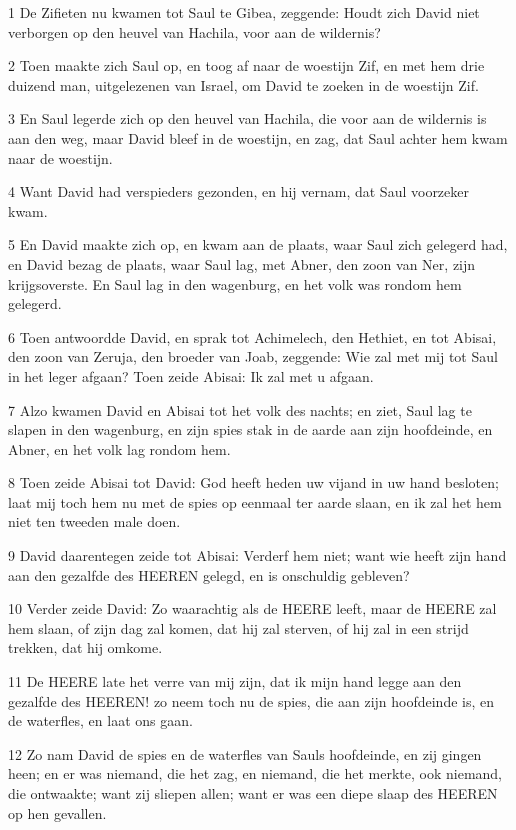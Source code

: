 \par 1 De Zifieten nu kwamen tot Saul te Gibea, zeggende: Houdt zich David niet verborgen op den heuvel van Hachila, voor aan de wildernis?
\par 2 Toen maakte zich Saul op, en toog af naar de woestijn Zif, en met hem drie duizend man, uitgelezenen van Israel, om David te zoeken in de woestijn Zif.
\par 3 En Saul legerde zich op den heuvel van Hachila, die voor aan de wildernis is aan den weg, maar David bleef in de woestijn, en zag, dat Saul achter hem kwam naar de woestijn.
\par 4 Want David had verspieders gezonden, en hij vernam, dat Saul voorzeker kwam.
\par 5 En David maakte zich op, en kwam aan de plaats, waar Saul zich gelegerd had, en David bezag de plaats, waar Saul lag, met Abner, den zoon van Ner, zijn krijgsoverste. En Saul lag in den wagenburg, en het volk was rondom hem gelegerd.
\par 6 Toen antwoordde David, en sprak tot Achimelech, den Hethiet, en tot Abisai, den zoon van Zeruja, den broeder van Joab, zeggende: Wie zal met mij tot Saul in het leger afgaan? Toen zeide Abisai: Ik zal met u afgaan.
\par 7 Alzo kwamen David en Abisai tot het volk des nachts; en ziet, Saul lag te slapen in den wagenburg, en zijn spies stak in de aarde aan zijn hoofdeinde, en Abner, en het volk lag rondom hem.
\par 8 Toen zeide Abisai tot David: God heeft heden uw vijand in uw hand besloten; laat mij toch hem nu met de spies op eenmaal ter aarde slaan, en ik zal het hem niet ten tweeden male doen.
\par 9 David daarentegen zeide tot Abisai: Verderf hem niet; want wie heeft zijn hand aan den gezalfde des HEEREN gelegd, en is onschuldig gebleven?
\par 10 Verder zeide David: Zo waarachtig als de HEERE leeft, maar de HEERE zal hem slaan, of zijn dag zal komen, dat hij zal sterven, of hij zal in een strijd trekken, dat hij omkome.
\par 11 De HEERE late het verre van mij zijn, dat ik mijn hand legge aan den gezalfde des HEEREN! zo neem toch nu de spies, die aan zijn hoofdeinde is, en de waterfles, en laat ons gaan.
\par 12 Zo nam David de spies en de waterfles van Sauls hoofdeinde, en zij gingen heen; en er was niemand, die het zag, en niemand, die het merkte, ook niemand, die ontwaakte; want zij sliepen allen; want er was een diepe slaap des HEEREN op hen gevallen.
